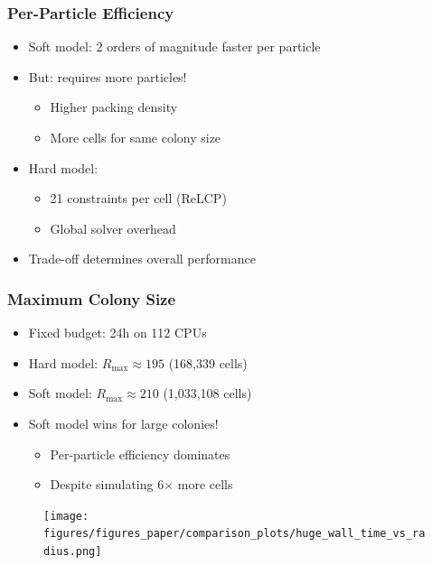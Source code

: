 \documentclass[
	10pt,
	t
]{beamer}
\begin{document}
\begin{frame}
    \frametitle{Per-Particle Efficiency}

    \begin{itemize}
        \item Soft model: 2 orders of magnitude faster per particle
        \item But: requires more particles!
              \begin{itemize}
                  \item Higher packing density
                  \item More cells for same colony size
              \end{itemize}
        \item Hard model:
              \begin{itemize}
                  \item 21 constraints per cell (ReLCP)
                  \item Global solver overhead
              \end{itemize}
        \item Trade-off determines overall performance
    \end{itemize}

\end{frame}

\begin{frame}
    \frametitle{Maximum Colony Size}

    \begin{itemize}
        \item Fixed budget: 24h on 112 CPUs
        \item Hard model: $R_{\text{max}} \approx 195$ (168,339 cells)
        \item Soft model: $R_{\text{max}} \approx 210$ (1,033,108 cells)
        \item Soft model wins for large colonies!
              \begin{itemize}
                  \item Per-particle efficiency dominates
                  \item Despite simulating 6$\times$ more cells
              \end{itemize}
    \end{itemize}

    \vspace{0.2cm}

    \begin{figure}
        \centering
        \texttt{[image: figures/figures\_paper/comparison\_plots/huge\_wall\_time\_vs\_radius.png]}
    \end{figure}

\end{frame}
\end{document}
